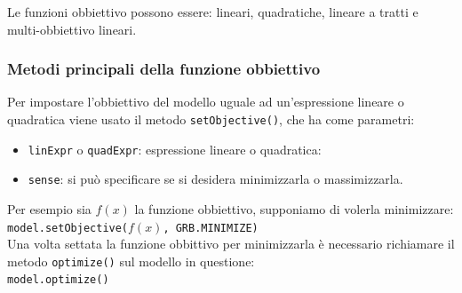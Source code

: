 Le funzioni obbiettivo possono essere: lineari, quadratiche, lineare a tratti e multi-obbiettivo lineari.

\subsubsection*{Metodi principali della funzione obbiettivo}
Per impostare l'obbiettivo del modello uguale ad un'espressione lineare o quadratica viene usato il metodo \texttt{setObjective()}, che ha come parametri:
\begin{itemize}
\item \texttt{linExpr} o \texttt{quadExpr}: espressione lineare o quadratica:
\item \texttt{sense}: si può specificare se si desidera minimizzarla o massimizzarla.
\end{itemize}

Per esempio sia $f(x)$ la funzione obbiettivo, supponiamo di volerla minimizzare:\\
\texttt{model.setObjective($f(x)$, GRB.MINIMIZE)}\\
Una volta settata la funzione obbittivo per minimizzarla è necessario richiamare il metodo \texttt{optimize()} sul modello in questione:\\
\texttt{model.optimize()}
